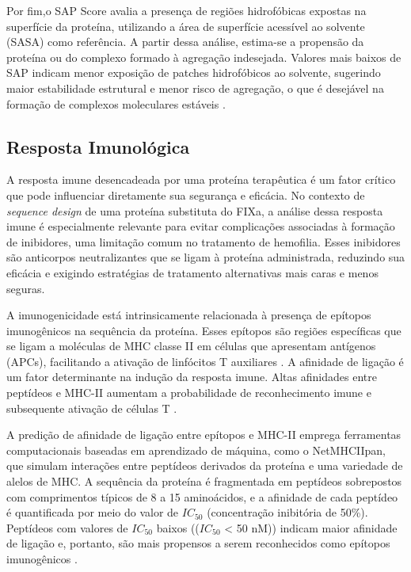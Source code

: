 Por fim,o SAP Score avalia a presença de regiões hidrofóbicas expostas na superfície da proteína, 
utilizando a área de superfície acessível ao solvente (SASA) como referência. 
A partir dessa análise, estima-se a propensão da proteína ou do complexo formado à agregação indesejada.
Valores mais baixos de SAP indicam menor exposição de patches hidrofóbicos ao solvente,
sugerindo maior estabilidade estrutural e menor risco de agregação, o que é desejável na formação de complexos moleculares estáveis
\cite{Docking}.





\subsection{Resposta Imunológica}
\label{subsection:RespImuno} 

A resposta imune desencadeada por uma proteína terapêutica é um fator crítico 
que pode influenciar diretamente sua segurança e eficácia. 
No contexto de \textit{sequence design} de uma proteína substituta do FIXa,
a análise dessa resposta imune é especialmente relevante para evitar complicações associadas à formação de inibidores,
uma limitação comum no tratamento de hemofilia. 
Esses inibidores são anticorpos neutralizantes que se ligam à proteína administrada,
reduzindo sua eficácia e exigindo estratégias de tratamento alternativas mais caras e menos seguras.

A imunogenicidade está intrinsicamente relacionada à presença de epítopos imunogênicos na sequência da proteína. 
Esses epítopos são regiões específicas que se ligam a moléculas de MHC classe II em células 
que apresentam antígenos (APCs), 
facilitando a ativação de linfócitos T auxiliares \cite{Imuno}. 
A afinidade de ligação é um fator determinante na indução da resposta imune. 
Altas afinidades entre peptídeos e MHC-II aumentam a probabilidade 
de reconhecimento imune e subsequente ativação de células T \cite{Imuno}.

A predição de afinidade de ligação entre epítopos e MHC-II emprega ferramentas computacionais 
baseadas em aprendizado de máquina,
como o NetMHCIIpan, que simulam interações entre peptídeos derivados da proteína e uma variedade de alelos de MHC. 
A sequência da proteína é fragmentada em peptídeos sobrepostos com comprimentos típicos de 8 a 15 aminoácidos,
e a afinidade de cada peptídeo é quantificada por meio do valor de $IC_{50}$ (concentração inibitória de 50\%).
Peptídeos com valores de $IC_{50}$ baixos (($IC_{50}$ < 50 nM)) indicam maior afinidade de ligação e, portanto, 
são mais propensos a serem reconhecidos como epítopos imunogênicos \cite{Imuno}.

